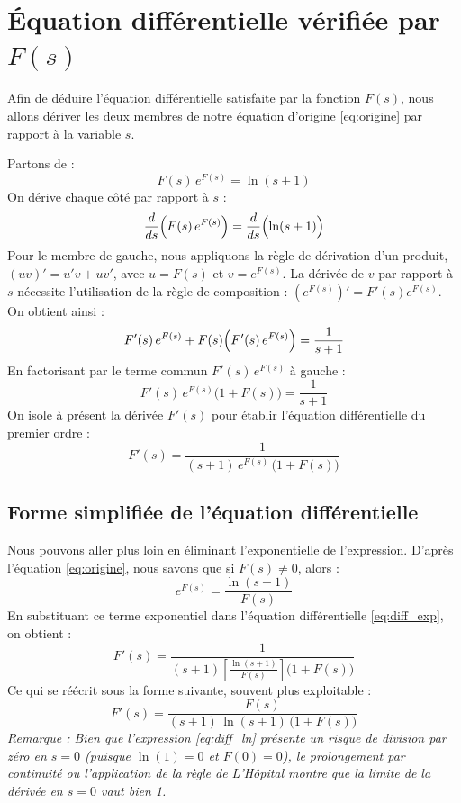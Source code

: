 \documentclass[french]{article}
\begin{document}
\section{Équation différentielle vérifiée par \(F(s)\)}

Afin de déduire l'équation différentielle satisfaite par la fonction \(F(s)\), nous allons dériver les deux membres de notre équation d'origine \eqref{eq:origine} par rapport à la variable \(s\).

Partons de :
\[
F(s)\,e^{F(s)} = \ln(s+1)
\]
On dérive chaque côté par rapport à \(s\) :
\[
\frac{d}{ds}\Bigl(F(s)\,e^{F(s)}\Bigr) = \frac{d}{ds}\Bigl(\ln(s+1)\Bigr)
\]
Pour le membre de gauche, nous appliquons la règle de dérivation d'un produit, \((uv)' = u'v + uv'\), avec \(u = F(s)\) et \(v = e^{F(s)}\). La dérivée de \(v\) par rapport à \(s\) nécessite l'utilisation de la règle de composition : \((e^{F(s)})' = F'(s)e^{F(s)}\).
On obtient ainsi :
\[
F'(s)\,e^{F(s)} + F(s)\Bigl(F'(s)\,e^{F(s)}\Bigr) = \frac{1}{s+1}
\]
En factorisant par le terme commun \(F'(s)\,e^{F(s)}\) à gauche :
\[
F'(s)\,e^{F(s)}\bigl(1 + F(s)\bigr) = \frac{1}{s+1}
\]
On isole à présent la dérivée \(F'(s)\) pour établir l'équation différentielle du premier ordre :
\begin{equation}\label{eq:diff_exp}
\boxed{ F'(s) = \frac{1}{(s+1)\,e^{F(s)}\,\bigl(1+F(s)\bigr)} }
\end{equation}

\subsection*{Forme simplifiée de l'équation différentielle}
Nous pouvons aller plus loin en éliminant l'exponentielle de l'expression. D'après l'équation \eqref{eq:origine}, nous savons que si \(F(s) \neq 0\), alors :
\[
e^{F(s)} = \frac{\ln(s+1)}{F(s)}
\]
En substituant ce terme exponentiel dans l'équation différentielle \eqref{eq:diff_exp}, on obtient :
\[
F'(s) = \frac{1}{(s+1)\left[\frac{\ln(s+1)}{F(s)}\right]\bigl(1+F(s)\bigr)}
\]
Ce qui se réécrit sous la forme suivante, souvent plus exploitable :
\begin{equation}\label{eq:diff_ln}
\boxed{ F'(s) = \frac{F(s)}{(s+1)\,\ln(s+1)\,\bigl(1+F(s)\bigr)} }
\end{equation}
\textit{Remarque : Bien que l'expression \eqref{eq:diff_ln} présente un risque de division par zéro en \(s=0\) (puisque \(\ln(1)=0\) et \(F(0)=0\)), le prolongement par continuité ou l'application de la règle de L'Hôpital montre que la limite de la dérivée en \(s=0\) vaut bien 1.}
\end{document}
